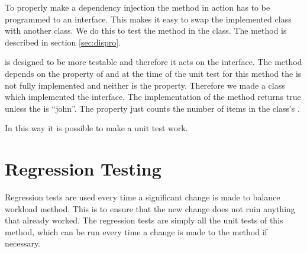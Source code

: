 To properly make a dependency injection the method in action has to be programmed to an interface. 
This makes it easy to swap the implemented class with another class. 
We do this to test the method  in the  class. 
The method is described in section \ref{sec:dispro}.

 is designed to be more testable and therefore it acts on the  interface. 
The method depends on the  property of  and at the time of the unit test for this method the  is not fully implemented and neither is the  property. 
Therefore we made a  class which implemented the  interface.
The  implementation of the  method returns true unless the  is ``john''. 
The  property just counts the number of items in the  class's . 

In this way it is possible to make a unit test work.

\section{Regression Testing}
\label{sec:regression_balance_workload}
Regression tests are used every time a significant change is made to balance workload method.
This is to ensure that the new change does not ruin anything that already worked.
The regression tests are simply all the unit tests of this method, which can be run every time a change is made to the method if necessary.
